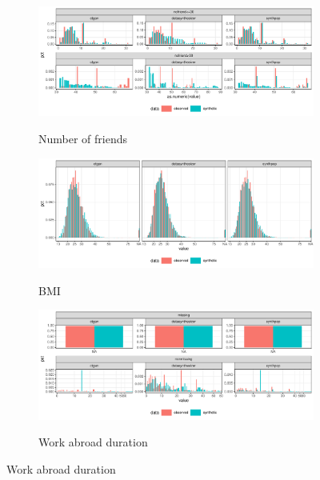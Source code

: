 \begin{figure}[ht]
    \caption{Comparing one-way frequency of select variables and ROE}
    \label{fig:graph_frequency_compare}
    \centering

    \begin{subfigure}{\textwidth}
        \centering        
        \caption{Number of friends}
        \includegraphics[width=.9\linewidth]{../graphs/compare_nofriend_1.pdf}
        \label{subfig:graph_frequency_compare_nofriend}
    \end{subfigure}

    \begin{subfigure}{\textwidth}
        \centering        
        \caption{BMI}
        \includegraphics[width=.9\linewidth]{../graphs/compare_bmi_1.pdf}
        \label{subfig:graph_frequency_compare_bmi}
    \end{subfigure}

    \begin{subfigure}{\textwidth}
        \centering        
        \caption{Work abroad duration}
        \includegraphics[width=.9\linewidth]{../graphs/compare_wkabdur_1.pdf}
        \label{subfig:graph_frequency_compare_wkabdur}
    \end{subfigure}


\end{figure}

